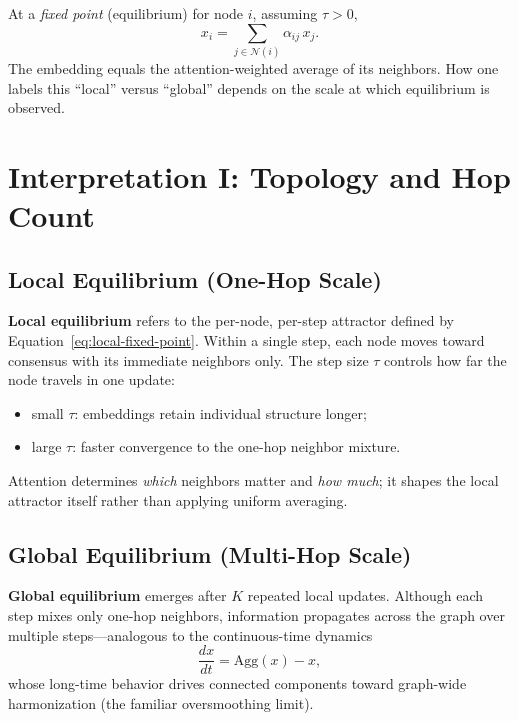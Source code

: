 \documentclass[11pt,a4paper]{report}
\begin{document}
At a \emph{fixed point} (equilibrium) for node $i$, assuming $\tau > 0$,
\begin{equation}
    x_i = \sum_{j \in \mathcal{N}(i)} \alpha_{ij}\, x_j.
    \label{eq:local-fixed-point}
\end{equation}
The embedding equals the attention-weighted average of its neighbors. How one labels this ``local'' versus ``global'' depends on the scale at which equilibrium is observed.

\section{Interpretation I: Topology and Hop Count}

\subsection{Local Equilibrium (One-Hop Scale)}

\textbf{Local equilibrium} refers to the per-node, per-step attractor defined by Equation~\eqref{eq:local-fixed-point}. Within a single step, each node moves toward consensus with its immediate neighbors only. The step size $\tau$ controls how far the node travels in one update:
\begin{itemize}[noitemsep]
    \item small $\tau$: embeddings retain individual structure longer;
    \item large $\tau$: faster convergence to the one-hop neighbor mixture.
\end{itemize}

Attention determines \emph{which} neighbors matter and \emph{how much}; it shapes the local attractor itself rather than applying uniform averaging.

\subsection{Global Equilibrium (Multi-Hop Scale)}

\textbf{Global equilibrium} emerges after $K$ repeated local updates. Although each step mixes only one-hop neighbors, information propagates across the graph over multiple steps---analogous to the continuous-time dynamics
\begin{equation}
    \frac{dx}{dt} = \mathrm{Agg}(x) - x,
\end{equation}
whose long-time behavior drives connected components toward graph-wide harmonization (the familiar oversmoothing limit).
\end{document}
